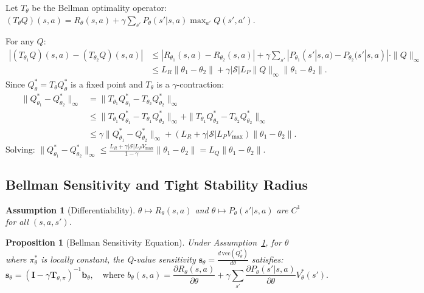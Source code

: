 \documentclass{article}
\newtheorem{proposition}{Proposition}
\newtheorem{assumption}{Assumption}
\newcommand{\cS}{\mathcal{S}}
\newcommand{\Vmax}{V_{\max}}
\begin{document}
Let $T_\theta$ be the Bellman optimality operator: $(T_\theta Q)(s,a) = R_\theta(s,a) + \gamma\sum_{s'}P_\theta(s'|s,a)\max_{a'}Q(s',a')$.

For any $Q$:
\begin{align}
|(T_{\theta_1}Q)(s,a) - (T_{\theta_2}Q)(s,a)| &\leq |R_{\theta_1}(s,a) - R_{\theta_2}(s,a)| + \gamma\sum_{s'}|P_{\theta_1}(s'|s,a) - P_{\theta_2}(s'|s,a)|\cdot\|Q\|_\infty \nonumber\\
&\leq L_R\|\theta_1 - \theta_2\| + \gamma|\cS|L_P\|Q\|_\infty\|\theta_1 - \theta_2\|.
\end{align}
Since $Q^*_\theta = T_\theta Q^*_\theta$ is a fixed point and $T_\theta$ is a $\gamma$-contraction:
\begin{align}
\|Q^*_{\theta_1} - Q^*_{\theta_2}\|_\infty &= \|T_{\theta_1}Q^*_{\theta_1} - T_{\theta_2}Q^*_{\theta_2}\|_\infty \nonumber\\
&\leq \|T_{\theta_1}Q^*_{\theta_1} - T_{\theta_1}Q^*_{\theta_2}\|_\infty + \|T_{\theta_1}Q^*_{\theta_2} - T_{\theta_2}Q^*_{\theta_2}\|_\infty \nonumber\\
&\leq \gamma\|Q^*_{\theta_1} - Q^*_{\theta_2}\|_\infty + (L_R + \gamma|\cS|L_P\Vmax)\|\theta_1 - \theta_2\|.
\end{align}
Solving: $\|Q^*_{\theta_1} - Q^*_{\theta_2}\|_\infty \leq \frac{L_R + \gamma|\cS|L_P\Vmax}{1-\gamma}\|\theta_1 - \theta_2\| = L_Q\|\theta_1 - \theta_2\|$.

\subsection{Bellman Sensitivity and Tight Stability Radius}

\begin{assumption}[Differentiability]
\label{asm:smooth}
$\theta \mapsto R_\theta(s,a)$ and $\theta \mapsto P_\theta(s'|s,a)$ are $C^1$ for all $(s,a,s')$.
\end{assumption}

\begin{proposition}[Bellman Sensitivity Equation]
\label{prop:sensitivity}
Under Assumption~\ref{asm:smooth}, for $\theta$ where $\pi^*_\theta$ is locally constant, the Q-value sensitivity $\mathbf{s}_\theta = \frac{d\,\mathrm{vec}(Q^*_\theta)}{d\theta}$ satisfies:
\begin{equation}
\mathbf{s}_\theta = (\mathbf{I} - \gamma\mathbf{T}_{\theta,\pi})^{-1}\mathbf{b}_\theta, \quad \text{where } b_\theta(s,a) = \frac{\partial R_\theta(s,a)}{\partial\theta} + \gamma\sum_{s'}\frac{\partial P_\theta(s'|s,a)}{\partial\theta}V^*_\theta(s').
\end{equation}
\end{proposition}
\end{document}

